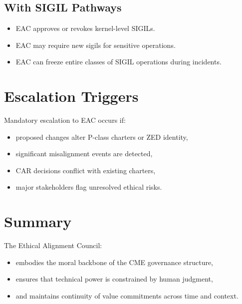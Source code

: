 \subsection{With SIGIL Pathways}

\begin{itemize}
    \item EAC approves or revokes kernel-level SIGILs.
    \item EAC may require new sigils for sensitive operations.
    \item EAC can freeze entire classes of SIGIL operations during incidents.
\end{itemize}

\section{Escalation Triggers}

Mandatory escalation to EAC occurs if:

\begin{itemize}
    \item proposed changes alter P-class charters or ZED identity,
    \item significant misalignment events are detected,
    \item CAR decisions conflict with existing charters,
    \item major stakeholders flag unresolved ethical risks.
\end{itemize}

\section{Summary}

The Ethical Alignment Council:
\begin{itemize}
    \item embodies the moral backbone of the CME governance structure,
    \item ensures that technical power is constrained by human judgment,
    \item and maintains continuity of value commitments across time and context.
\end{itemize}
